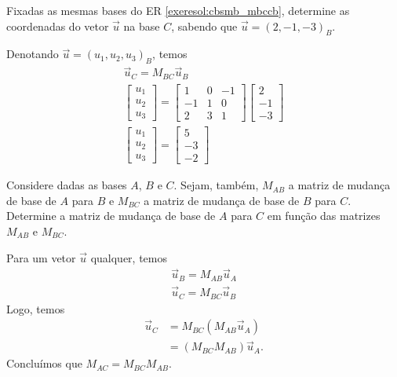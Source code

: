 \begin{exeresol}
  Fixadas as mesmas bases do ER \ref{exeresol:cbsmb_mbccb}, determine as coordenadas do vetor $\vec{u}$ na base $C$, sabendo que $\vec{u}=(2,-1,-3)_B$.
\end{exeresol}
\begin{resol}
  Denotando $\vec{u}=(u_1,u_2,u_3)_B$, temos
  \begin{gather}
    \vec{u}_C = M_{BC}\vec{u}_{B} \\
    \begin{bmatrix}
      u_1\\
      u_2\\
      u_3
    \end{bmatrix} =
    \begin{bmatrix}
      1 & 0 & -1 \\
      -1 & 1 & 0 \\
      2 & 3 & 1
    \end{bmatrix}
    \begin{bmatrix}
      2\\
      -1\\
      -3
    \end{bmatrix}\\
    \begin{bmatrix}
      u_1\\
      u_2\\
      u_3
    \end{bmatrix} =
    \begin{bmatrix}
      5\\
      -3\\
      -2
    \end{bmatrix}
  \end{gather}
\end{resol}

\begin{exeresol}
  Considere dadas as bases $A$, $B$ e $C$. Sejam, também, $M_{AB}$ a matriz de mudança de base de $A$ para $B$ e $M_{BC}$ a matriz de mudança de base de $B$ para $C$. Determine a matriz de mudança de base de $A$ para $C$ em função das matrizes $M_{AB}$ e $M_{BC}$.
\end{exeresol}
\begin{resol}
  Para um vetor $\vec{u}$ qualquer, temos
  \begin{gather}
    \vec{u}_B = M_{AB}\vec{u}_A\\
    \vec{u}_C = M_{BC}\vec{u}_B
  \end{gather}
  Logo, temos
  \begin{align}
    \vec{u}_C &= M_{BC}\left(M_{AB}\vec{u}_A\right)\\
              &= \left(M_{BC}M_{AB}\right)\vec{u}_A.
  \end{align}
  Concluímos que $M_{AC} = M_{BC}M_{AB}$.
\end{resol}

